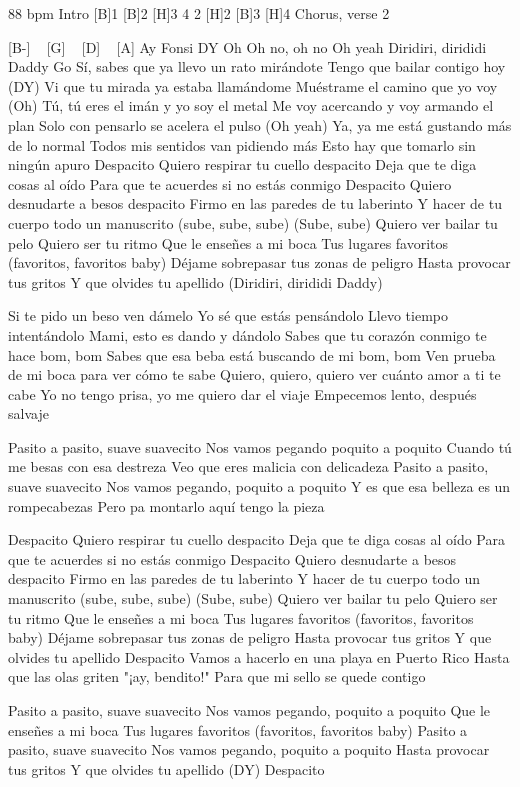 \begin{guitar}
88 bpm
Intro
[B]1 [B]2 [H]3 4 2 [H]2 [B]3 [H]4
Chorus, verse 2

[B-] ~ [G] ~ [D] ~ [A]
Ay
Fonsi
DY
Oh
Oh no, oh no
Oh yeah
Diridiri, dirididi Daddy
Go
Sí, sabes que ya llevo un rato mirándote
Tengo que bailar contigo hoy (DY)
Vi que tu mirada ya estaba llamándome
Muéstrame el camino que yo voy (Oh)
Tú, tú eres el imán y yo soy el metal
Me voy acercando y voy armando el plan
Solo con pensarlo se acelera el pulso (Oh yeah)
Ya, ya me está gustando más de lo normal
Todos mis sentidos van pidiendo más
Esto hay que tomarlo sin ningún apuro
Despacito
Quiero respirar tu cuello despacito
Deja que te diga cosas al oído
Para que te acuerdes si no estás conmigo
Despacito
Quiero desnudarte a besos despacito
Firmo en las paredes de tu laberinto
Y hacer de tu cuerpo todo un manuscrito (sube, sube, sube)
(Sube, sube)
Quiero ver bailar tu pelo
Quiero ser tu ritmo
Que le enseñes a mi boca
Tus lugares favoritos (favoritos, favoritos baby)
Déjame sobrepasar tus zonas de peligro
Hasta provocar tus gritos
Y que olvides tu apellido (Diridiri, dirididi Daddy)

Si te pido un beso ven dámelo
Yo sé que estás pensándolo
Llevo tiempo intentándolo
Mami, esto es dando y dándolo
Sabes que tu corazón conmigo te hace bom, bom
Sabes que esa beba está buscando de mi bom, bom
Ven prueba de mi boca para ver cómo te sabe
Quiero, quiero, quiero ver cuánto amor a ti te cabe
Yo no tengo prisa, yo me quiero dar el viaje
Empecemos lento, después salvaje

Pasito a pasito, suave suavecito
Nos vamos pegando poquito a poquito
Cuando tú me besas con esa destreza
Veo que eres malicia con delicadeza
Pasito a pasito, suave suavecito
Nos vamos pegando, poquito a poquito
Y es que esa belleza es un rompecabezas
Pero pa montarlo aquí tengo la pieza

Despacito
Quiero respirar tu cuello despacito
Deja que te diga cosas al oído
Para que te acuerdes si no estás conmigo
Despacito
Quiero desnudarte a besos despacito
Firmo en las paredes de tu laberinto
Y hacer de tu cuerpo todo un manuscrito (sube, sube, sube)
(Sube, sube)
Quiero ver bailar tu pelo
Quiero ser tu ritmo
Que le enseñes a mi boca
Tus lugares favoritos (favoritos, favoritos baby)
Déjame sobrepasar tus zonas de peligro
Hasta provocar tus gritos
Y que olvides tu apellido
Despacito
Vamos a hacerlo en una playa en Puerto Rico
Hasta que las olas griten "¡ay, bendito!"
Para que mi sello se quede contigo

Pasito a pasito, suave suavecito
Nos vamos pegando, poquito a poquito
Que le enseñes a mi boca
Tus lugares favoritos (favoritos, favoritos baby)
Pasito a pasito, suave suavecito
Nos vamos pegando, poquito a poquito
Hasta provocar tus gritos
Y que olvides tu apellido (DY)
Despacito
\end{guitar}